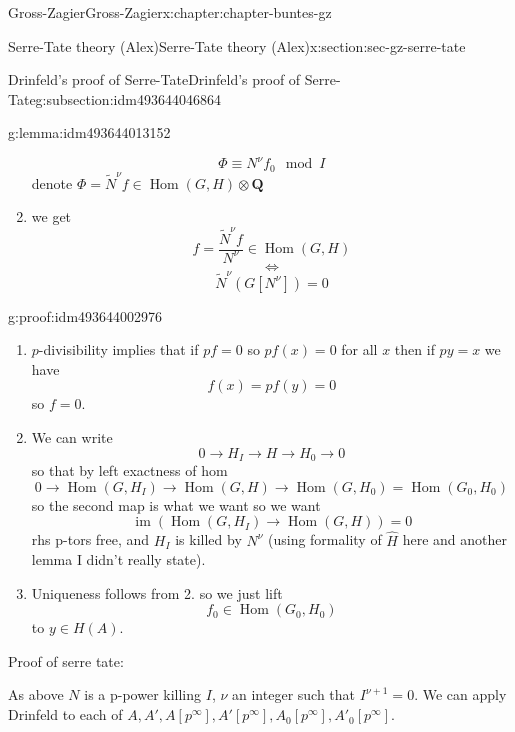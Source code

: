 \documentclass[oneside,10pt,]{book}
\numberwithin{equation}{section}
\newcommand{\lb}{[}
\newcommand{\rb}{]}
\newcommand{\QQ}{\mathbf{Q}}
\DeclareMathOperator{\Hom}{Hom}
\DeclareMathOperator{\im}{im}
\begin{document}
\begin{chapterptx}{Gross-Zagier}{}{Gross-Zagier}{}{}{x:chapter:chapter-buntes-gz}
\begin{sectionptx}{Serre-Tate theory (Alex)}{}{Serre-Tate theory (Alex)}{}{}{x:section:sec-gz-serre-tate}
\begin{subsectionptx}{Drinfeld's proof of Serre-Tate}{}{Drinfeld's proof of Serre-Tate}{}{}{g:subsection:idm493644046864}
\begin{lemma}{}{}{g:lemma:idm493644013152}
\begin{enumerate}
\begin{equation*}
\Phi \equiv  N^\nu f_0 \mod I
\end{equation*}
denote \(\Phi = \tilde N^\nu f \in \Hom(G,H) \otimes \QQ\)%
\item{}we get%
\begin{equation*}
f = \frac{\tilde N^\nu f}{N^\nu } \in \Hom (G,H)
\end{equation*}
%
\begin{equation*}
\iff
\end{equation*}
%
\begin{equation*}
\tilde N^\nu  (G[N^\nu  ] ) = 0
\end{equation*}
%
\end{enumerate}
%
\end{lemma}
\begin{proofptx}{}{g:proof:idm493644002976}
%
\begin{enumerate}
\item{}\(p\)-divisibility implies that if \(pf = 0\) so \(pf(x)=  0\) for all \(x\) then if \(py = x\) we have%
\begin{equation*}
f(x) = pf(y) =0
\end{equation*}
so \(f = 0\).%
\item{}We can write%
\begin{equation*}
0 \to H_I \to H \to H_0 \to 0
\end{equation*}
so that by left exactness of hom%
\begin{equation*}
0 \to \Hom(G, H_I) \to  \Hom(G, H) \to  \Hom(G, H_0) = \Hom(G_0, H_0)
\end{equation*}
so the second map is what we want so we want%
\begin{equation*}
\im(\Hom(G, H_I) \to \Hom(G,H)) = 0
\end{equation*}
rhs p-tors free, and \(H_I\) is killed by \(N^\nu \) (using formality of \(\hat H \) here and another lemma I didn't really state).%
\item{}Uniqueness follows from 2. so we just lift%
\begin{equation*}
f_0 \in \Hom(G_0, H_0)
\end{equation*}
to \(y \in H(A)\).%
\end{enumerate}
%
\end{proofptx}
\end{subsectionptx}
Proof of serre tate:%
\par
As above \(N\) is a p-power killing \(I\), \(\nu \) an integer  such that \(I^{\nu + 1} = 0\). We can apply Drinfeld to each of \(A, A', A\lb p^\infty \rb, A'\lb p^\infty \rb , A_0\lb p^\infty \rb , A'_0 \lb p^\infty \rb \).%

\end{sectionptx}
\end{chapterptx}
\end{document}
